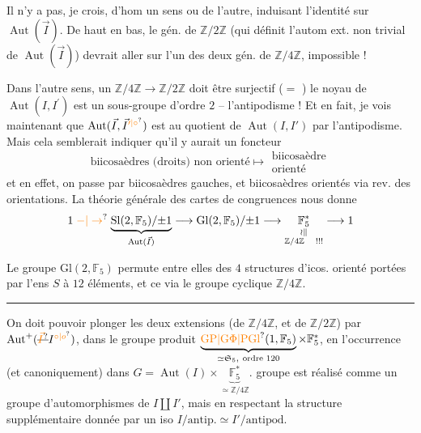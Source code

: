 Il n'y a pas, je crois, d'hom  un sens
ou de l'autre, induisant l'identité
sur $\operatorname{Aut}(\vec I)$. De haut en bas, le gén. de
$\mathbb Z/2\mathbb Z$ (qui définit l'autom ext. non trivial
de $\operatorname{Aut}(\vec I)$) devrait aller sur l'un des
deux gén. de $\mathbb Z/4\mathbb Z$, impossible !

Dans l'autre sens, un  $\mathbb Z/4\mathbb Z\longrightarrow\mathbb Z/2\mathbb Z$
doit être surjectif ($=$ ) le noyau
 de $\operatorname{Aut}(I,I^{\prime})$ est un sous-groupe
d'ordre $2$ -- l'antipodisme ! Et en fait,
je vois maintenant que $\operatorname{Aut}(\vec I,\vec I^{\unsure{\prime|\circ}})$ est 
 au quotient de  $\operatorname{Aut}(I,I')$
par l'antipodisme. Mais cela semblerait
indiquer qu'il y aurait un foncteur
\[
\text{biicosaèdres (droits) non orienté}\longmapsto\substack{\text{biicosaèdre}\\\text{orienté}}
\]
et en effet, on passe par biicosaèdres
gauches, et biicosaèdres orientés via rev.
des orientations.
La théorie générale des cartes de congruences
nous donne
\[
1\mathrel{\unsure{-|\to}}\underbrace{\mathrm{Sl}(2,\mathbb F_5)/{\pm1}}_{\operatorname{Aut}(\vec I)}
\longrightarrow\mathrm{Gl}(2,\mathbb F_5)/{\pm1}
\longrightarrow\underset{\substack{\wr\Vert\\\mathbb Z/4\mathbb Z\quad!!!}}{\mathbb F_5^*}\longrightarrow1
\]

Le groupe $\mathrm{Gl}(2,\mathbb F_5)$ permute entre elles
 des $4$ structures d'icos. orienté
portées par l'ens $S$ à $12$ éléments, et
ce via le groupe cyclique $\mathbb Z/4\mathbb Z$.

\begin{center}\rule{1.5cm}{.6pt}\end{center}

On doit pouvoir plonger les deux extensions
(de $\mathbb Z/4\mathbb Z$, et de $\mathbb Z/2\mathbb Z$) par $\operatorname{Aut}^+(\deleted{\unsure{\vec I}}I^{\unsure{\circ|o}})$, dans le
groupe produit 
$\underbrace{\unsure{\mathrm{GP}|\mathrm{G}\Phi|\mathrm{PGl}}(1,\mathbb F_5)}_{\simeq\mathfrak S_5,\ \text{ordre }120}\times\mathbb F_5^*$, en
l'occurrence (et canoniquement) dans
 $G=\operatorname{Aut}(I)\times\underbrace{\mathbb F_5^*}_{\simeq\mathbb Z/4\mathbb Z}$.
 groupe est
réalisé comme un groupe d'automorphismes
de  
$I\amalg I'$, mais en
respectant la structure supplémentaire
donnée par un iso $I/\mathrm{antip.}\simeq I'/\mathrm{antipod.}$

